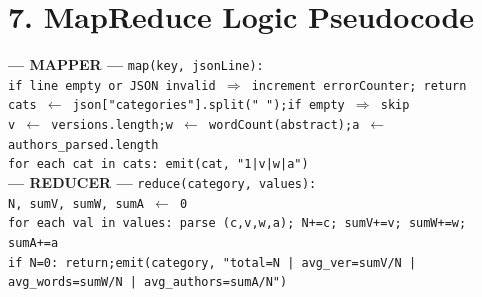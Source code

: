 \documentclass[11pt,a4paper]{article}
\begin{document}
\section*{7. MapReduce Logic Pseudocode}
 {\footnotesize
  \begin{flushleft}
    \textbf{--- MAPPER ---}\quad
    \texttt{map(key, jsonLine):}\\
    \hspace*{1em}\texttt{if line empty or JSON invalid $\Rightarrow$ increment errorCounter; return}\\
    \hspace*{1em}\texttt{cats $\leftarrow$ json["categories"].split(" ");\quad if empty $\Rightarrow$ skip}\\
    \hspace*{1em}\texttt{v $\leftarrow$ versions.length;\quad w $\leftarrow$ wordCount(abstract);\quad a $\leftarrow$ authors\_parsed.length}\\
    \hspace*{1em}\texttt{for each cat in cats: emit(cat, "1|v|w|a")}\\[2pt]
    \textbf{--- REDUCER ---}\quad
    \texttt{reduce(category, values):}\\
    \hspace*{1em}\texttt{N, sumV, sumW, sumA $\leftarrow$ 0}\\
    \hspace*{1em}\texttt{for each val in values: parse (c,v,w,a); N+=c;\; sumV+=v;\; sumW+=w;\; sumA+=a}\\
    \hspace*{1em}\texttt{if N=0: return;\quad emit(category, "total=N | avg\_ver=sumV/N | avg\_words=sumW/N | avg\_authors=sumA/N")}
  \end{flushleft}
 }
\end{document}

